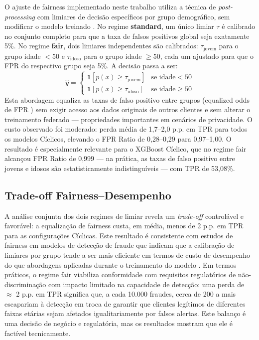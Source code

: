 O ajuste de fairness implementado neste trabalho utiliza a técnica de \textit{post-processing} com limiares de decisão específicos por grupo demográfico, sem modificar o modelo treinado \cite{hardt2016equality}. No regime \textbf{standard}, um único limiar $\tau$ é calibrado no conjunto completo para que a taxa de falsos positivos global seja exatamente 5\%. No regime \textbf{fair}, dois limiares independentes são calibrados: $\tau_{\text{jovem}}$ para o grupo idade $< 50$ e $\tau_{\text{idoso}}$ para o grupo idade $\geq 50$, cada um ajustado para que o FPR do respectivo grupo seja 5\%. A decisão passa a ser:
\[
\hat{y} = \begin{cases}
\mathds{1}[p(x) \geq \tau_{\text{jovem}}] & \text{se~idade} < 50 \\
\mathds{1}[p(x) \geq \tau_{\text{idoso}}] & \text{se~idade} \geq 50
\end{cases}
\]
Esta abordagem equaliza as taxas de falso positivo entre grupos (equalized odds de FPR \cite{hardt2016equality}) sem exigir acesso aos dados originais de outros clientes e sem alterar o treinamento federado --- propriedades importantes em cenários de privacidade. O custo observado foi moderado: perda média de 1,7--2,0 p.p. em TPR para todos os modelos Cíclicos, elevando o FPR Ratio de 0,28--0,29 para 0,97--1,00. O resultado é especialmente relevante para o XGBoost Cíclico, que no regime fair alcançou FPR Ratio de 0,999 --- na prática, as taxas de falso positivo entre jovens e idosos são estatisticamente indistinguíveis --- com TPR de 53,08\%.

\subsection{Trade-off Fairness--Desempenho}

A análise conjunta dos dois regimes de limiar revela um \textit{trade-off} controlável e favorável: a equalização de fairness custa, em média, menos de 2 p.p. em TPR para as configurações Cíclicas. Este resultado é consistente com estudos de fairness em modelos de detecção de fraude que indicam que a calibração de limiares por grupo tende a ser mais eficiente em termos de custo de desempenho do que abordagens aplicadas durante o treinamento do modelo \cite{hardt2016equality}. Em termos práticos, o regime fair viabiliza conformidade com requisitos regulatórios de não-discriminação \cite{gdpr2016} com impacto limitado na capacidade de detecção: uma perda de $\approx$ 2 p.p. em TPR significa que, a cada 10.000 fraudes, cerca de 200 a mais escapariam à detecção em troca de garantir que clientes legítimos de diferentes faixas etárias sejam afetados igualitariamente por falsos alertas. Este balanço é uma decisão de negócio e regulatória, mas os resultados mostram que ele é factível tecnicamente.

